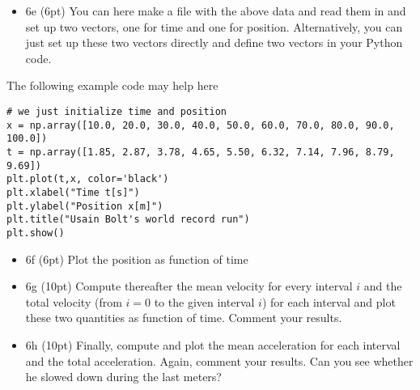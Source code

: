 \documentclass[%
oneside,                 %
final,                   %
10pt]{article}
\begin{document}
\noindent
\begin{itemize}
\item 6e (6pt) You can here make a file with the above data and read them in and set up two vectors, one for time and one for position. Alternatively, you can just set up these two vectors directly and define two vectors in your Python code.
\end{itemize}

\noindent
The following example code may help here









\begin{verbatim}
# we just initialize time and position
x = np.array([10.0, 20.0, 30.0, 40.0, 50.0, 60.0, 70.0, 80.0, 90.0, 100.0])
t = np.array([1.85, 2.87, 3.78, 4.65, 5.50, 6.32, 7.14, 7.96, 8.79, 9.69])
plt.plot(t,x, color='black')
plt.xlabel("Time t[s]")
plt.ylabel("Position x[m]")
plt.title("Usain Bolt's world record run")
plt.show()

\end{verbatim}


\begin{itemize}
\item 6f (6pt) Plot the position as function of time

\item 6g (10pt) Compute thereafter the mean velocity for every interval $i$ and the total velocity (from $i=0$ to the given interval $i$) for each interval and plot these two quantities as function of time. Comment your results.

\item 6h (10pt) Finally, compute and plot the mean acceleration for each interval and the total acceleration. Again, comment your results. Can you see whether he slowed down during the last meters? 
\end{itemize}

\noindent

\end{document}
